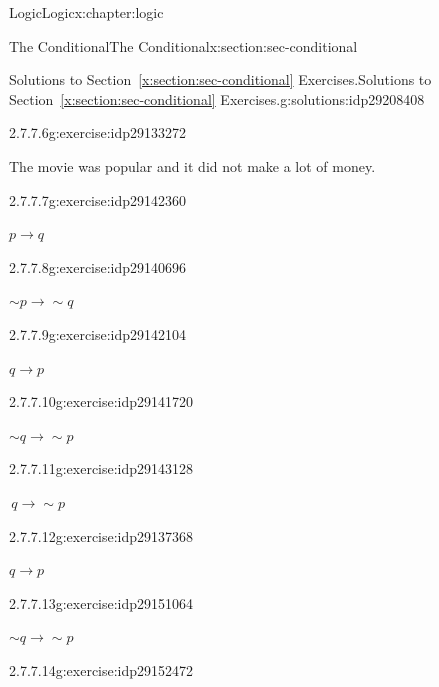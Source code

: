 \documentclass[twoside,10pt,]{book}
\newcommand{\xreffont}{\relax}
\numberwithin{equation}{section}
\newcommand{\conditional}{{p {\rightarrow} q}}
\newcommand{\inverse}{{\sim\!{p}{} {\rightarrow} \sim\!{q}{}}}
\newcommand{\converse}{{q {\rightarrow} p}}
\newcommand{\contrapositive}{{\sim\!{q}{} {\rightarrow} \sim\!{p}{}}}
\begin{document}
\begin{chapterptx}{Logic}{}{Logic}{}{}{x:chapter:logic}
\begin{sectionptx}{The Conditional}{}{The Conditional}{}{}{x:section:sec-conditional}
\begin{solutions-subsection}{Solutions to Section~{\xreffont\ref*{x:section:sec-conditional}} Exercises.}{}{Solutions to Section~{\xreffont\ref*{x:section:sec-conditional}} Exercises.}{}{}{g:solutions:idp29208408}
\begin{exercisegroup}
\begin{divisionsolutioneg}{2.7.7.6}{}{g:exercise:idp29133272}
\par\smallskip%
\noindent\hypertarget{g:solution:idp29141976-main}{}The movie was popular and it did not make a lot of money.\end{divisionsolutioneg}%
\end{exercisegroup}
\par\medskip\noindent
\begin{exercisegroup}
\begin{divisionsolutioneg}{2.7.7.7}{}{g:exercise:idp29142360}%
\par\smallskip%
\noindent\hypertarget{g:solution:idp29145048-main}{}\(\conditional\)\end{divisionsolutioneg}%
\begin{divisionsolutioneg}{2.7.7.8}{}{g:exercise:idp29140696}%
\par\smallskip%
\noindent\hypertarget{g:solution:idp29144408-main}{}\(\inverse\)\end{divisionsolutioneg}%
\begin{divisionsolutioneg}{2.7.7.9}{}{g:exercise:idp29142104}%
\par\smallskip%
\noindent\hypertarget{g:solution:idp29144536-main}{}\(\converse \)\end{divisionsolutioneg}%
\begin{divisionsolutioneg}{2.7.7.10}{}{g:exercise:idp29141720}%
\par\smallskip%
\noindent\hypertarget{g:solution:idp29140440-main}{}\(\contrapositive\)\end{divisionsolutioneg}%
\begin{divisionsolutioneg}{2.7.7.11}{}{g:exercise:idp29143128}%
\par\smallskip%
\noindent\hypertarget{g:solution:idp29139160-main}{}\(\, q {\rightarrow}{} \sim\!{p}{}\)\end{divisionsolutioneg}%
\begin{divisionsolutioneg}{2.7.7.12}{}{g:exercise:idp29137368}%
\par\smallskip%
\noindent\hypertarget{g:solution:idp29139288-main}{}\(\converse\)\end{divisionsolutioneg}%
\begin{divisionsolutioneg}{2.7.7.13}{}{g:exercise:idp29151064}%
\par\smallskip%
\noindent\hypertarget{g:solution:idp29147736-main}{}\(\contrapositive \)\end{divisionsolutioneg}%
\begin{divisionsolutioneg}{2.7.7.14}{}{g:exercise:idp29152472}%
\par\smallskip%

\end{divisionsolutioneg}
\end{exercisegroup}
\end{solutions-subsection}
\end{sectionptx}
\end{chapterptx}
\end{document}
